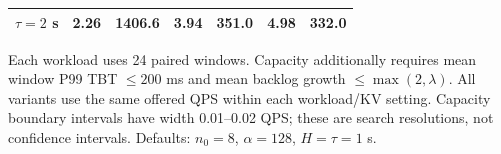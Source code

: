 \begin{table}[t]
\begin{tabular}{lrrrrrr}
$\tau=2$ s & 2.26 & 1406.6 & 3.94 & 351.0 & 4.98 & 332.0 \\
\bottomrule
\end{tabular}
\par\smallskip
\begin{minipage}{0.96\textwidth}\footnotesize
Each workload uses 24 paired windows. Capacity additionally requires mean window P99 TBT $\leq200$ ms and mean backlog growth $\leq\max(2,\lambda)$. All variants use the same offered QPS within each workload/KV setting. Capacity boundary intervals have width 0.01--0.02 QPS; these are search resolutions, not confidence intervals. Defaults: $n_0=8$, $\alpha=128$, $H=\tau=1$ s.
\end{minipage}
\end{table}

